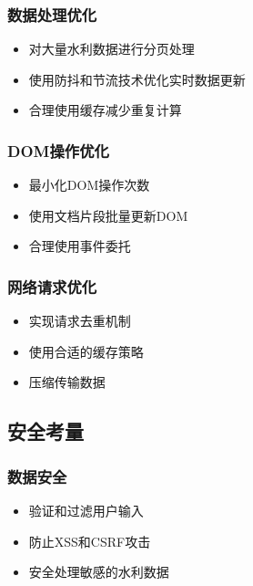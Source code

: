 \subsubsection{数据处理优化}\label{ux6570ux636eux5904ux7406ux4f18ux5316}

\begin{itemize}
\tightlist
\item
  对大量水利数据进行分页处理
\item
  使用防抖和节流技术优化实时数据更新
\item
  合理使用缓存减少重复计算
\end{itemize}

\subsubsection{DOM操作优化}\label{domux64cdux4f5cux4f18ux5316}

\begin{itemize}
\tightlist
\item
  最小化DOM操作次数
\item
  使用文档片段批量更新DOM
\item
  合理使用事件委托
\end{itemize}

\subsubsection{网络请求优化}\label{ux7f51ux7edcux8bf7ux6c42ux4f18ux5316}

\begin{itemize}
\tightlist
\item
  实现请求去重机制
\item
  使用合适的缓存策略
\item
  压缩传输数据
\end{itemize}

\subsection{安全考量}\label{ux5b89ux5168ux8003ux91cf}

\subsubsection{数据安全}\label{ux6570ux636eux5b89ux5168}

\begin{itemize}
\tightlist
\item
  验证和过滤用户输入
\item
  防止XSS和CSRF攻击
\item
  安全处理敏感的水利数据
\end{itemize}


